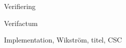 \begin{frame}{Verifiering}

\begin{center}
\end{center}

\end{frame}

\begin{frame}{Verifactum}

Implementation, Wikström, titel, CSC

\end{frame}
